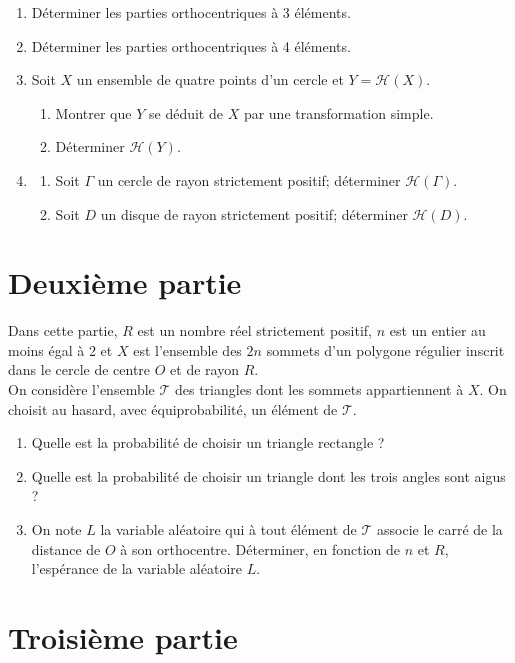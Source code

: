 \documentclass[landscape,twocolumn,leqno,a4paper,10pt]{report} %
\newcommand\n{\noindent}
\begin{document}
\begin{enumerate}
	\item Déterminer les parties orthocentriques à 3 éléments.
	\item Déterminer les parties orthocentriques à 4 éléments.
	\item Soit $X$ un ensemble de quatre points d'un cercle et $Y=\mathcal{H}(X)$.
	\begin{enumerate}
		\item Montrer que $Y$ se déduit de $X$ par une transformation simple.
		\item Déterminer $\mathcal{H}(Y)$.
	\end{enumerate}
	\item \begin{enumerate}
		\item Soit $\Gamma$ un cercle de rayon strictement positif; déterminer $\mathcal{H}(\Gamma)$.
		\item Soit $D$ un disque de rayon strictement positif; déterminer $\mathcal{H}(D)$.
	\end{enumerate}
\end{enumerate}

\newpage

\section{Deuxième partie}

\n Dans cette partie, $R$ est un nombre réel strictement positif, $n$ est un entier au moins égal à 2 et $X$ est l'ensemble des $2 n$ sommets d'un polygone régulier inscrit dans le cercle de centre $O$ et de rayon $R$.\\
On considère l'ensemble $\mathcal{T}$ des triangles dont les sommets appartiennent à $X$. On choisit au hasard, avec équiprobabilité, un élément de $\mathcal{T}$.

\begin{enumerate}
	\item Quelle est la probabilité de choisir un triangle rectangle ?
	\item Quelle est la probabilité de choisir un triangle dont les trois angles sont aigus ?
	\item On note $L$ la variable aléatoire qui à tout élément de $\mathcal{T}$ associe le carré de la distance de $O$ à son orthocentre. Déterminer, en fonction de $n$ et $R$, l'espérance de la variable aléatoire $L$.
\end{enumerate}


\section{Troisième partie}
\end{document}
